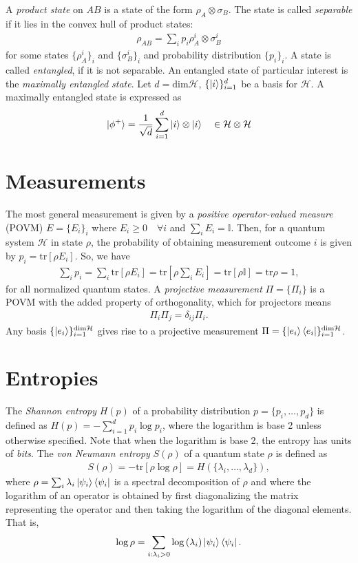 \documentclass[10pt,oneside,longbibliography]{report}
\begin{document}
A \textit{product state} on $AB$ is a state of the form $\rho_A \otimes \sigma_B$. The state is called \textit{separable} if it lies in the convex hull of product states: 
\begin{align}
    \rho_{AB} = \sum_{i} p_i \rho_A^i \otimes \sigma_B^i
\end{align}
for some states $\{\rho_A^i\}_i$ and $\{\sigma_B^i\}_i$ and  probability distribution $\{p_i\}_i$. A state is called \textit{entangled}, if it is not separable. An entangled state of particular interest is the \textit{maximally entangled state}. Let $d=\text{dim}\mathcal{H}$, $\{\ket{i}\}_{i=1}^d$ be a basis for $\mathcal{H}$. A maximally entangled state is expressed as
\begin{align}
    \ket{\phi^+} = \frac{1}{\sqrt{d}} \sum_{i=1}^d \ket{i}\otimes \ket{i} \quad \in \mathcal{H}\otimes \mathcal{H}
\end{align}
\section{Measurements}
The most general measurement is given by a \textit{positive operator-valued measure} (POVM) $E=\{E_i\}_i$ where $E_i \geq 0 \quad \forall i$ and $\sum_i E_i = \mathbb{I}$. Then, for a quantum system $\mathcal{H}$ in state $\rho$, the probability of obtaining measurement outcome $i$ is given by $p_i = \text{tr}[\rho E_i]$. So, we have 
\begin{align}
    \sum_i p_i = \sum_i \text{tr}[\rho E_i] = \text{tr}\left[\rho \sum_i E_ i\right] = \text{tr}[\rho \mathbb{I}] = \text{tr}\rho = 1,
\end{align}
for all normalized quantum states. A \textit{projective measurement} $\Pi =\{\Pi_i \}$ is a POVM with the added property of orthogonality, which for projectors means
\begin{align}
    \Pi_i \Pi_j =\delta_{ij} \Pi_i.
\end{align}
Any basis $\{\ket{e_i}\}^{\text{dim}\mathcal{H}}_{i=1}$ gives rise to a projective measurement $\Pi=\{\ket{e_i}\bra{e_i}\}_{i=1}^{\text{dim}\mathcal{H}}$.
\section{Entropies}
The \textit{Shannon entropy} $H(p)$ of a probability distribution $p=\{p_i, \dots, p_d\}$ is defined as $H(p)=-\sum_{i=1}^{d}p_i \log{p_i}$, where the logarithm is base 2 unless otherwise specified. Note that when the logarithm is base 2, the entropy has units of \textit{bits}. The \textit{von Neumann entropy} $S(\rho)$ of a quantum state $\rho$ is defined as 
\begin{align}
    S(\rho) = -\text{tr}\left[\rho \log \rho\right] = H(\{\lambda_i, \dots, \lambda_d\}),
\end{align}
where $\rho=\sum_i \lambda_i \ket{\psi_i}\bra{\psi_i}$ is a spectral decomposition of $\rho$ and where the logarithm of an operator is obtained by first diagonalizing the matrix representing the operator and then taking the logarithm of the diagonal elements. That is,
\begin{align}
    \log{\rho} = \sum_{i:\lambda_i >0} \log{(\lambda_i)} \ket{\psi_i}\bra{\psi_i}.
\end{align}
\end{document}

